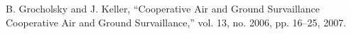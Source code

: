 \begin{thebibliography}{99}
 B. Grocholsky and J. Keller, “Cooperative Air and Ground Survaillance Cooperative Air and Ground Survaillance,” vol. 13, no. 2006, pp. 16–25, 2007.
\end{thebibliography}
